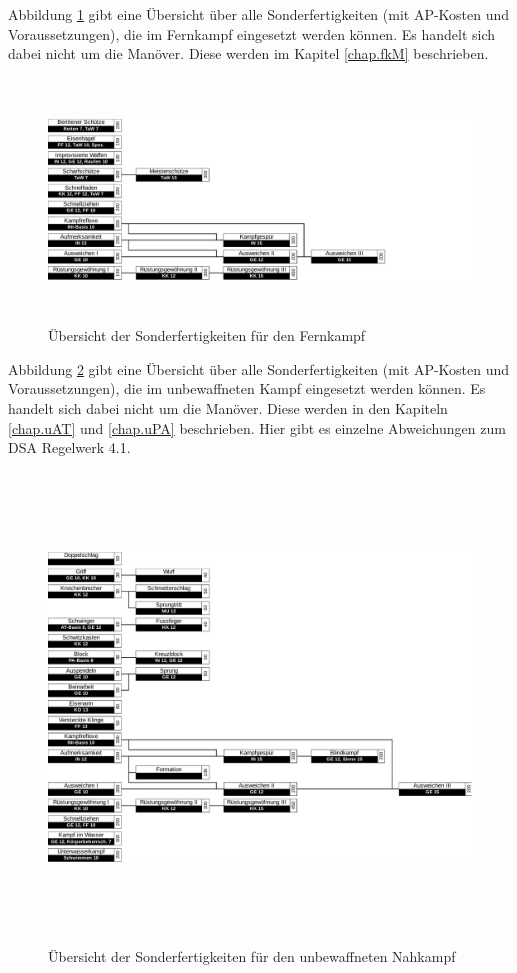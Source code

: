 Abbildung \ref{fig.fkSF} gibt eine Übersicht über alle Sonderfertigkeiten (mit AP-Kosten und Voraussetzungen), die im Fernkampf eingesetzt werden können.
Es handelt sich dabei nicht um die Manöver. Diese werden im Kapitel \ref{chap.fkM} beschrieben.

\begin{figure}
    \centering
    \includegraphics[width=16.93cm,height=6.454cm]{fig/fkSF.pdf}
    \caption{Übersicht der Sonderfertigkeiten für den Fernkampf}
    \label{fig.fkSF}
\end{figure}

Abbildung \ref{fig.uSF} gibt eine Übersicht über alle Sonderfertigkeiten (mit AP-Kosten und Voraussetzungen), die im unbewaffneten Kampf eingesetzt werden können.
Es handelt sich dabei nicht um die Manöver.
Diese werden in den Kapiteln \ref{chap.uAT} und \ref{chap.uPA} beschrieben.
Hier gibt es einzelne Abweichungen zum DSA Regelwerk 4.1.

\begin{figure}
    \centering
    \includegraphics[width=16.976cm,height=12.437cm]{fig/uSF.pdf}
    \caption{Übersicht der Sonderfertigkeiten für den unbewaffneten Nahkampf}
    \label{fig.uSF}
\end{figure}

